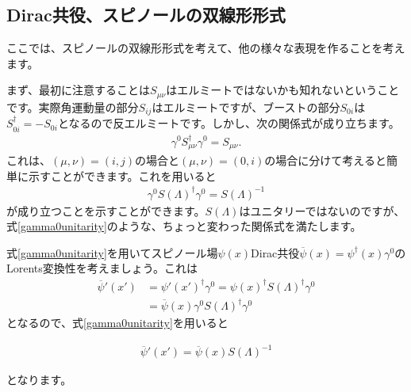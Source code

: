 \documentclass[report,paper=a4, fontsize=12pt, line_length=16cm, number_of_lines=33,dvipdfmx]{jlreq}
\newenvironment{important}{\begin{tcolorbox}[
  colback = white,
  colframe = red!35,
  boxrule = 2mm,
  fonttitle = \bfseries,
  after = \noindent] }{\end{tcolorbox}}
\numberwithin{equation}{chapter}
\newcommand{\psib}{\overline{\psi}}
\begin{document}
\subsection{Dirac共役、スピノールの双線形形式}
ここでは、スピノールの双線形形式を考えて、他の様々な表現を作ることを考えます。

まず、最初に注意することは$S_{\mu\nu}$はエルミートではないかも知れないということです。実際角運動量の部分$S_{ij}$はエルミートですが、ブーストの部分$S_{0i}$は$S_{0i}^{\dag}=-S_{0i}$となるので反エルミートです。しかし、次の関係式が成り立ちます。
\begin{align}
  \gamma^{0}S_{\mu\nu}^{\dag}\gamma^{0}=S_{\mu\nu}.
\end{align}
これは、$(\mu,\nu)=(i,j)$の場合と$(\mu,\nu)=(0,i)$の場合に分けて考えると簡単に示すことができます。これを用いると
\begin{align}
  \gamma^{0}S(\Lambda)^{\dag}\gamma^{0}=S(\Lambda)^{-1}\label{gamma0unitarity}
\end{align}
が成り立つことを示すことができます。$S(\Lambda)$はユニタリーではないのですが、式\eqref{gamma0unitarity}のような、ちょっと変わった関係式を満たします。

式\eqref{gamma0unitarity}を用いてスピノール場$\psi(x)$Dirac共役$\psib(x)=\psi^{\dag}(x)\gamma^{0}$のLorents変換性を考えましょう。これは
\begin{align}
  \psib'(x')
  &=\psi'(x')^{\dag}\gamma^{0}
  =\psi(x)^{\dag}S(\Lambda)^{\dag}\gamma^{0}\nonumber\\
  &=\psib(x)\gamma^{0}S(\Lambda)^{\dag}\gamma^{0}
\end{align}
となるので、式\eqref{gamma0unitarity}を用いると
\begin{important}
  \begin{align}
    \psib'(x')=\psib(x)S(\Lambda)^{-1}\label{diracconjtransf}
  \end{align}
\end{important}
となります。
\end{document}
